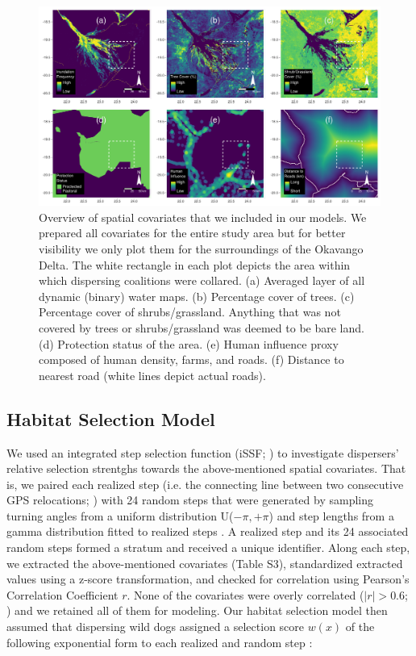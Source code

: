 \documentclass[abstract=on,10pt,a4paper,bibliography=totocnumbered]{article}
\begin{document}
\begin{figure}[h]
  \begin{center}
    \includegraphics[width = \textwidth]{99_Covariates.pdf}
    \caption{Overview of spatial covariates that we included in our models. We
    prepared all covariates for the entire study area but for better visibility
    we only plot them for the surroundings of the Okavango Delta. The white
    rectangle in each plot depicts the area within which dispersing coalitions
    were collared. (a) Averaged layer of all dynamic (binary) water maps. (b)
    Percentage cover of trees. (c) Percentage cover of shrubs/grassland.
    Anything that was not covered by trees or shrubs/grassland was deemed to be
    bare land. (d) Protection status of the area. (e) Human influence proxy
    composed of human density, farms, and roads. (f) Distance to nearest road
    (white lines depict actual roads).}
    \label{Covariates}
  \end{center}
\end{figure}

\subsection{Habitat Selection Model}
We used an integrated step selection function (iSSF; \citealp{Avgar.2016}) to
investigate dispersers' relative selection strentghs towards the above-mentioned
spatial covariates. That is, we paired each realized step (i.e. the connecting
line between two consecutive GPS relocations; \citealp{Turchin.1998}) with 24
random steps that were generated by sampling turning angles from a uniform
distribution U(\(-\pi, +\pi\)) and step lengths from a gamma distribution fitted
to realized steps \citep{Avgar.2016}. A realized step and its 24 associated
random steps formed a stratum and received a unique identifier. Along each step,
we extracted the above-mentioned covariates (Table S3), standardized extracted
values using a z-score transformation, and checked for correlation using
Pearson's Correlation Coefficient \(r\). None of the covariates were overly
correlated (\(|r| > 0.6\); \citealp{Latham.2011}) and we retained all of them
for modeling. Our habitat selection model then assumed that dispersing wild dogs
assigned a selection score \(w(x)\) of the following exponential form to each
realized and random step \citep{Fortin.2005}:
\end{document}
